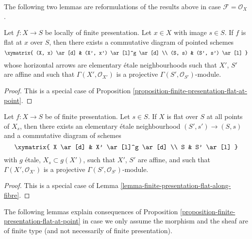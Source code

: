 \noindent
The following two lemmas are reformulations of the results
above in case $\mathcal{F} = \mathcal{O}_X$.

\begin{lemma}
\label{lemma-finite-presentation-flat-at-point-X}
Let $f : X \to S$ be locally of finite presentation.
Let $x \in X$ with image $s \in S$.
If $f$ is flat at $x$ over $S$, then there exists a commutative
diagram of pointed schemes
$$
\xymatrix{
(X, x) \ar[d] & (X', x') \ar[l]^g \ar[d] \\
(S, s) & (S', s') \ar[l]
}
$$
whose horizontal arrows are elementary \'etale neighbourhoods
such that $X'$, $S'$ are affine and such that
$\Gamma(X', \mathcal{O}_{X'})$ is a projective
$\Gamma(S', \mathcal{O}_{S'})$-module.
\end{lemma}

\begin{proof}
This is a special case of
Proposition \ref{proposition-finite-presentation-flat-at-point}.
\end{proof}

\begin{lemma}
\label{lemma-finite-presentation-flat-along-fibre-X}
Let $f : X \to S$ be of finite presentation.
Let $s \in S$.
If $X$ is flat over $S$ at all points of $X_s$, then
there exists an elementary \'etale neighbourhood
$(S', s') \to (S, s)$ and a commutative diagram of schemes
$$
\xymatrix{
X \ar[d] & X' \ar[l]^g \ar[d] \\
S & S' \ar[l]
}
$$
with $g$ \'etale, $X_s \subset g(X')$, such that $X'$, $S'$
are affine, and such that
$\Gamma(X', \mathcal{O}_{X'})$ is a projective
$\Gamma(S', \mathcal{O}_{S'})$-module.
\end{lemma}

\begin{proof}
This is a special case of
Lemma \ref{lemma-finite-presentation-flat-along-fibre}.
\end{proof}

\noindent
The following lemmas explain consequences of
Proposition \ref{proposition-finite-presentation-flat-at-point}
in case we only assume the morphism and the sheaf are of finite type
(and not necessarily of finite presentation).

